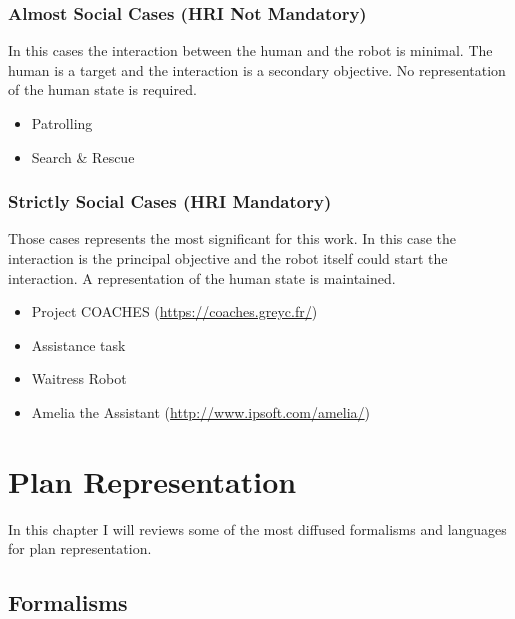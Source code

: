 \documentclass[pdftex,12pt,a4paper]{report}
\begin{document}
\subsection{Almost Social Cases (HRI Not Mandatory)}
In this cases the interaction between the human and the robot is minimal. The human is a target and the interaction is a secondary objective. No representation of the human state is required.
\begin{itemize}
\item Patrolling
\item Search \& Rescue
\end{itemize}

\subsection{Strictly Social Cases (HRI Mandatory)}
Those cases represents the most significant for this work. In this case the interaction is the principal objective and the robot itself could start the interaction. A representation of the human state is maintained.
\begin{itemize}
\item Project COACHES (\url{https://coaches.greyc.fr/})
\item Assistance task
\item Waitress Robot
\item Amelia the Assistant (\url{http://www.ipsoft.com/amelia/})
\end{itemize}
\noindent

\chapter{Plan Representation}\label{sec:formalism}
In this chapter I will reviews some of the most diffused formalisms and languages for plan representation.
\section{Formalisms}\label{sec:formalism}
\end{document}
